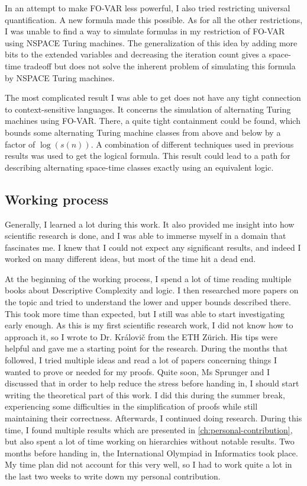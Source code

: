 In an attempt to make FO-VAR less powerful, I also tried restricting universal quantification.
A new formula made this possible.
As for all the other restrictions, I was unable to find a way to simulate formulas in my restriction of FO-VAR using NSPACE Turing machines.
The generalization of this idea by adding more bits to the extended variables and decreasing the iteration count gives a space-time tradeoff but does not solve the inherent problem of simulating this formula by NSPACE Turing machines.

The most complicated result I was able to get does not have any tight connection to context-sensitive languages.
It concerns the simulation of alternating Turing machines using FO-VAR\@.
There, a quite tight containment could be found, which bounds some alternating Turing machine classes from above and below by a factor of $\log(s(n))$.
A combination of different techniques used in previous results was used to get the logical formula.
This result could lead to a path for describing alternating space-time classes exactly using an equivalent logic.

\subsection{Working process}\label{subsec:working-process}
Generally, I learned a lot during this work.
It also provided me insight into how scientific research is done, and I was able to immerse myself in a domain that fascinates me.
I knew that I could not expect any significant results, and indeed I worked on many different ideas, but most of the time hit a dead end.

At the beginning of the working process, I spend a lot of time reading multiple books about Descriptive Complexity and logic.
I then researched more papers on the topic and tried to understand the lower and upper bounds described there.
This took more time than expected, but I still was able to start investigating early enough.
As this is my first scientific research work, I did not know how to approach it, so I wrote to Dr. Královi\v{c} from the ETH Zürich.
His tips were helpful and gave me a starting point for the research.
During the months that followed, I tried multiple ideas and read a lot of papers concerning things I wanted to prove or needed for my proofs.
Quite soon, Ms Sprunger and I discussed that in order to help reduce the stress before handing in, I should start writing the theoretical part of this work.
I did this during the summer break, experiencing some difficulties in the simplification of proofs while still maintaining their correctness.
Afterwards, I continued doing research.
During this time, I found multiple results which are presented in \cref{ch:personal-contribution}, but also spent a lot of time working on hierarchies without notable results.
Two months before handing in, the International Olympiad in Informatics took place.
My time plan did not account for this very well, so I had to work quite a lot in the last two weeks to write down my personal contribution.

